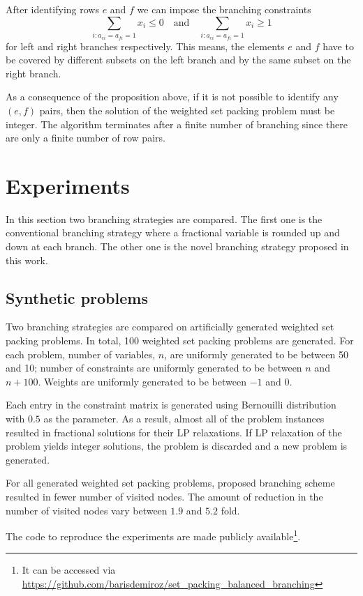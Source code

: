 \documentclass{article}
\begin{document}
After identifying rows $e$ and $f$ we can impose the branching constraints
\[
  \sum_{i:a_{ei} = a_{fi} = 1} x_i \le 0 \quad \text{and} \quad \sum_{i:a_{ei} = a_{fi} = 1} x_i \ge 1
\]
for left and right branches respectively. This means, the elements $e$ and $f$ have to be covered by different subsets on the left branch and by the same subset on the right branch.

As a consequence of the proposition above, if it is not possible to identify any $(e, f)$ pairs, then the solution of the weighted set packing problem must be integer. The algorithm terminates after a finite number of branching since there are only a finite number
of row pairs. 


\section{Experiments}
In this section two branching strategies are compared. The first one is the conventional branching strategy where a fractional variable is rounded up and down at each branch. The other one is the novel branching strategy proposed in this work.

\subsection{Synthetic problems}
Two branching strategies are compared on artificially generated weighted set packing problems. In total, 100 weighted set packing problems are generated. For each problem, number of variables, $n$, are uniformly generated to be between 50 and 10; number of constraints are uniformly generated to be between $n$ and $n+100$. Weights are uniformly generated to be between $-1$ and $0$.

Each entry in the constraint matrix is generated using Bernouilli distribution with $0.5$ as the parameter. As a result, almost all of the problem instances resulted in fractional solutions for their LP relaxations. If LP relaxation of the problem yields integer solutions, the problem is discarded and a new problem is generated.

For all generated weighted set packing problems, proposed branching scheme resulted in fewer number of visited nodes. The amount of reduction in the number of visited nodes vary between $1.9$ and $5.2$ fold.

The code to reproduce the experiments are made publicly available\footnote{It can be accessed via  \url{https://github.com/barisdemiroz/set_packing_balanced_branching}}.
\end{document}
